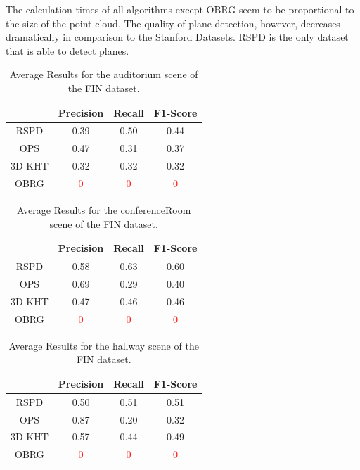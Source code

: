 \documentclass[main.tex]{subfiles}
\begin{document}
The calculation times of all algorithms except OBRG seem to be proportional to the size of the point cloud.
The quality of plane detection, however, decreases dramatically in comparison to the Stanford Datasets. RSPD is the only dataset that
is able to detect planes. %


\begin{table}[]
    \centering
    \begin{tabular}{c|ccc}
               & Precision          & Recall             & F1-Score           \\ \hline
        RSPD   & 0.39               & 0.50               & 0.44               \\
        OPS    & 0.47               & 0.31               & 0.37               \\
        3D-KHT & 0.32               & 0.32               & 0.32               \\
        OBRG   & \textcolor{red}{0} & \textcolor{red}{0} & \textcolor{red}{0}
    \end{tabular}%
    \caption{Average Results for the auditorium scene of the FIN dataset.}
    \label{tab:res-fin-audi}
\end{table}

\begin{table}[]
    \centering
    \begin{tabular}{c|ccc}
               & Precision          & Recall             & F1-Score           \\ \hline
        RSPD   & 0.58               & 0.63               & 0.60               \\
        OPS    & 0.69               & 0.29               & 0.40               \\
        3D-KHT & 0.47               & 0.46               & 0.46               \\
        OBRG   & \textcolor{red}{0} & \textcolor{red}{0} & \textcolor{red}{0}
    \end{tabular}%
    \caption{Average Results for the conferenceRoom scene of the FIN dataset.}
    \label{tab:res-fin-conf}
\end{table}

\begin{table}[]
    \centering
    \begin{tabular}{c|ccc}
               & Precision          & Recall             & F1-Score           \\ \hline
        RSPD   & 0.50               & 0.51               & 0.51               \\
        OPS    & 0.87               & 0.20               & 0.32               \\
        3D-KHT & 0.57               & 0.44               & 0.49               \\
        OBRG   & \textcolor{red}{0} & \textcolor{red}{0} & \textcolor{red}{0}
    \end{tabular}%
    \caption{Average Results for the hallway scene of the FIN dataset.}
    \label{tab:res-fin-hall}
\end{table}
\end{document}
